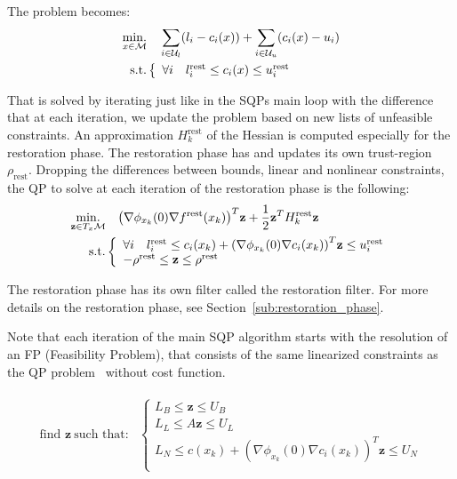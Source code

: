 The problem becomes:
\begin{align}
\label{eq:restoration_problem_simple}
  \operatorname*{min.}_{x \in \mathcal{M}} & \quad \sum_{i\in\mathcal{U}_l} (l_i - c_i(x)) +\sum_{i\in\mathcal{U}_u} (c_i(x) - u_i)\\ \nonumber
  \text{s.t.}&\left\{
  \begin{array}{lr}
    \forall i \quad l^\text{rest}_i \leq c_i(x) \leq u^\text{rest}_i \\
  \end{array}\right.
\end{align}


That is solved by iterating just like in the SQPs main loop with the difference that at each iteration, we update the problem based on new lists of unfeasible constraints.
An approximation $H^\text{rest}_k$ of the Hessian is computed especially for the restoration phase.
The restoration phase has and updates its own trust-region $\rho_\text{rest}$.
Dropping the differences between bounds, linear and nonlinear constraints, the QP to solve at each iteration of the restoration phase is the following:
\begin{align}
  \label{eq:QP_restoration}
  \begin{split}
  \operatorname*{min.}_{\mathbf{z} \in T_x\mathcal{M} } & \quad {\left(\nabla\phi_{x_k}(0) \nabla f^\text{rest} (x_k)\right)}^T\mathbf{z} + \frac{1}{2} {\bf z }^T H^\text{rest}_k{\bf z }\\
  \text{s.t.}&\left\{
  \begin{array}{lr}
    \forall i \quad l^\text{rest}_i \leq c_i(x_k) + {\left(\nabla\phi_{x_k}(0) \nabla c_i (x_k)\right)}^T\mathbf{z} \leq u^\text{rest}_i \\
    -\rho^\text{rest} \leq \mathbf{z} \leq \rho^\text{rest} \\
  \end{array}\right.
  \end{split}
\end{align}


The restoration phase has its own filter called the restoration filter.
For more details on the restoration phase, see Section~\ref{sub:restoration_phase}.

Note that each iteration of the main SQP algorithm starts with the resolution of an FP (Feasibility Problem), that consists of the same linearized constraints as the QP problem~ without cost function.

\begin{align}
  \label{eq:FP_txm}
  \begin{split}
  \text{find } \mathbf{z}\ \text{such that:}&\left\{
  \begin{array}{lr}
    L_B \leq \mathbf{z} \leq U_B \\
    L_L \leq A \mathbf{z} \leq U_L \\
    L_N \leq c(x_k) + {\left(\nabla\phi_{x_k}(0) \nabla c_i (x_k)\right)}^T\mathbf{z}\leq U_N\\
  \end{array}\right.
  \end{split}
\end{align}

